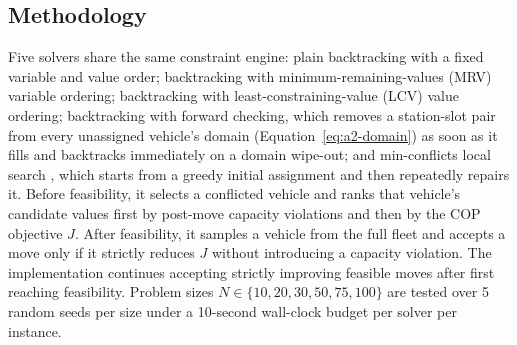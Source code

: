 \documentclass{ai-lab-report}
\begin{document}
\subsection{Methodology}
Five solvers share the same constraint engine: plain backtracking with a fixed variable and value order; backtracking with minimum-remaining-values (MRV) variable ordering; backtracking with least-constraining-value (LCV) value ordering; backtracking with forward checking, which removes a station-slot pair from every unassigned vehicle's domain (Equation~\eqref{eq:a2-domain}) as soon as it fills and backtracks immediately on a domain wipe-out; and min-conflicts local search \citep{minton1992conflicts}, which starts from a greedy initial assignment and then repeatedly repairs it. Before feasibility, it selects a conflicted vehicle and ranks that vehicle's candidate values first by post-move capacity violations and then by the COP objective $J$. After feasibility, it samples a vehicle from the full fleet and accepts a move only if it strictly reduces $J$ without introducing a capacity violation. The implementation continues accepting strictly improving feasible moves after first reaching feasibility. Problem sizes $N\in\{10,20,30,50,75,100\}$ are tested over 5 random seeds per size under a 10-second wall-clock budget per solver per instance.
\end{document}

